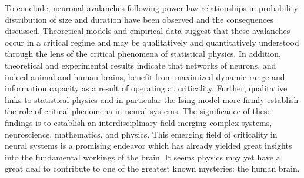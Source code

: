 \documentclass[12pt]{article}
\begin{document}
To conclude, neuronal avalanches following power law relationships in probability distribution of size and duration have been observed and the consequences discussed. Theoretical models and empirical data suggest that these avalanches occur in a critical regime and may be qualitatively and quantitatively understood through the lens of the critical phenomena of statistical physics. In addition, theoretical and experimental results indicate that networks of neurons, and indeed animal and human brains, benefit from maximized dynamic range and information capacity as a result of operating at criticality. Further, qualitative links to statistical physics and in particular the Ising model more firmly establish the role of critical phenomena in neural systems. The significance of these findings is to establish an interdisciplinary field merging complex systems, neuroscience, mathematics, and physics. This emerging field of criticality in neural systems is a promising endeavor which has already yielded great insights into the fundamental workings of the brain. It seems physics may yet have a great deal to contribute to one of the greatest known mysteries: the human brain. 




\end{document}
